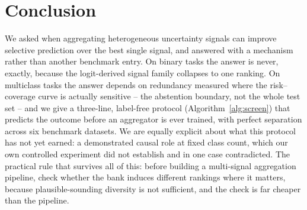 \documentclass[conference]{IEEEtran}
\begin{document}
\section{Conclusion}
\label{sec:conclusion}

We asked when aggregating heterogeneous uncertainty signals can improve selective prediction over the best single signal, and answered with a mechanism rather than another benchmark entry. On binary tasks the answer is never, exactly, because the logit-derived signal family collapses to one ranking. On multiclass tasks the answer depends on redundancy measured where the risk--coverage curve is actually sensitive -- the abstention boundary, not the whole test set -- and we give a three-line, label-free protocol (Algorithm~\ref{alg:screen}) that predicts the outcome before an aggregator is ever trained, with perfect separation across six benchmark datasets. We are equally explicit about what this protocol has not yet earned: a demonstrated causal role at fixed class count, which our own controlled experiment did not establish and in one case contradicted. The practical rule that survives all of this: before building a multi-signal aggregation pipeline, check whether the bank induces different rankings where it matters, because plausible-sounding diversity is not sufficient, and the check is far cheaper than the pipeline.



\end{document}
